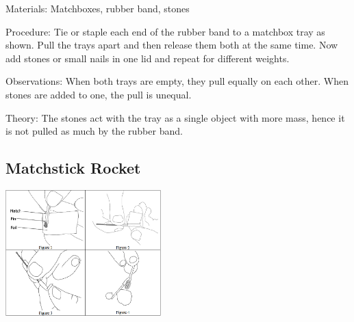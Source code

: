\begin{multicols}{2}
\begin{description*}
\item[Materials:]{Matchboxes, rubber band, stones}
\item[Procedure:]{Tie or staple each end of the rubber band to a matchbox tray as shown. Pull the trays apart and then release them both at the same time. Now add stones or small nails in one lid and repeat for different weights.}
\item[Observations:]{When both trays are empty, they pull equally on each other. When stones are added to one, the pull is unequal.}
\item[Theory:]{The stones act with the tray as a single object with more mass, hence it is not pulled as much by the rubber band.}
\end{description*}

\subsection{Matchstick Rocket} 

\begin{center}
\includegraphics[width=0.45\textwidth]{./img/matchstick-rocket-1.png}
\end{center}


\end{multicols}
